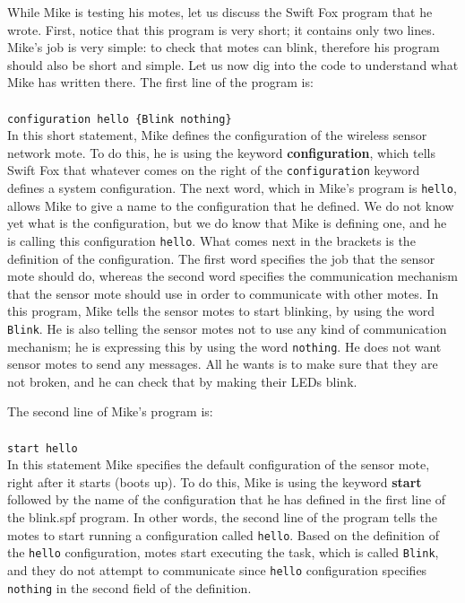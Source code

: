 \documentclass[11pt]{article}
\begin{document}
While Mike is testing his motes, let us discuss the Swift Fox program that 
he wrote. First, notice that this program is very short; it contains only
two lines. Mike's job is very simple: to check that motes can blink,
therefore his program should also be short and simple. Let us now dig into 
the code to understand what Mike has written there. The first line of the
program is:								\\
\\
\texttt{configuration hello \{Blink nothing\}}				\\

In this short statement, Mike defines the configuration of the 
wireless sensor network mote. To do this, he is using the keyword
\textbf{configuration}, which tells Swift Fox that whatever comes on the
right of the \texttt{configuration} keyword defines a system configuration.
The next word, which in Mike's program is \texttt{hello}, allows Mike to
give a name to the configuration that he defined. We do not know yet what
is the configuration, but we do know that Mike is defining one, and he is
calling this configuration \texttt{hello}. What comes next in the brackets 
is the definition of the configuration. The first word specifies the job
that the sensor mote should do, whereas the second word specifies the
communication mechanism that the sensor mote should use in order to
communicate with other motes. In this program, Mike tells the sensor motes 
to start blinking, by using the word \texttt{Blink}. He is also telling
the sensor motes not to use any kind of communication mechanism; he is
expressing this by using the word \texttt{nothing}. He does not want sensor
motes to send any messages. All he wants is to make sure that they are not 
broken, and he can check that by making their LEDs blink.

The second line of Mike's program is:					\\
\\
\texttt{start hello}							\\

In this statement Mike specifies the default configuration of the sensor
mote, right after it starts (boots up). To do this, Mike is using the
keyword \textbf{start} followed by the name of the configuration that he
has defined in the first line of the blink.spf program. In other words, the
second line of the program tells the motes to start running a configuration
called \texttt{hello}. Based on the definition of the \texttt{hello}
configuration, motes start executing the task, which is called
\texttt{Blink}, and they do not attempt to communicate since \texttt{hello}
configuration specifies \texttt{nothing} in the second field of the
definition.
\end{document}
